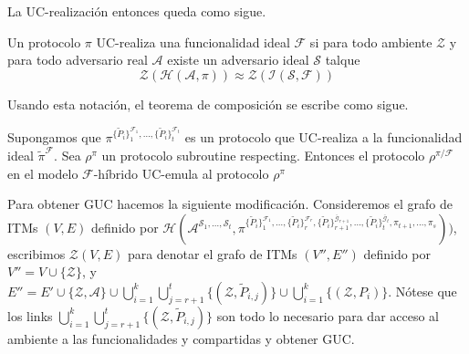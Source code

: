 La UC-realización entonces queda como sigue.

\begin{definicion}
Un protocolo $\pi$ UC-realiza una funcionalidad ideal $\mathcal{F}$ si para todo ambiente
$\mathcal{Z}$ y para todo adversario real $\mathcal{A}$ existe un adversario ideal $\mathcal{S}$
talque
$$\mathcal{Z}(\mathcal{H}(\mathcal{A},\pi))
\approx
\mathcal{Z}(\mathcal{I}(\mathcal{S},\mathcal{F}))$$
\end{definicion}

Usando esta notación, el teorema de composición se escribe como sigue.

\begin{teorema}
Supongamos que
$\pi^{
    \{\tilde{P}_i\}_1^{\mathcal{F}_1},
    \ldots,
    \{\tilde{P}_i\}_t^{\mathcal{F}_t}}$
es un protocolo que UC-realiza a la funcionalidad ideal $\tilde{\pi}^{\mathcal{F}}$. Sea $\rho^\pi$
un protocolo subroutine respecting. Entonces el protocolo
$\rho^{\pi/\mathcal{F}}$ en el modelo $\mathcal{F}$-híbrido UC-emula al protocolo $\rho^\pi$
\end{teorema}

Para obtener GUC hacemos la siguiente modificación. Consideremos el grafo de ITMs $(V, E)$ 
definido por
$\mathcal{H}(
    \mathcal{A}^{\mathcal{S}_1, \ldots, \mathcal{S}_t},
    \pi^{
        \{\tilde{P}_i\}_1^{\mathcal{F}_1},
        \ldots,
        \{\tilde{P}_i\}_r^{\mathcal{F}_r},
        \{\tilde{P}_i\}_{r+1}^{\bar{\mathcal{G}}_{r+1}},
        \ldots,
        \{\tilde{P}_i\}_t^{\bar{\mathcal{G}}_t},
        \pi_{t+1},
        \ldots,
        \pi_s}))$,
escribimos $\mathcal{Z}(V, E)$ para denotar el grafo de ITMs $(V'', E'')$ definido por $V'' = V \cup
\{\mathcal{Z}\}$, y $E'' = E' \cup \{\mathcal{Z}, \mathcal{A}\} \cup \bigcup_{i=1}^k
\bigcup_{j=r+1}^t \{(\mathcal{Z}, \tilde{P}_{i,j})\} \cup \bigcup_{i=1}^k \{(\mathcal{Z}, P_i)\}$.
Nótese que los links $\bigcup_{i=1}^k \bigcup_{j=r+1}^t \{(\mathcal{Z}, \tilde{P}_{i,j})\}$ son todo
lo necesario para dar acceso al ambiente a las funcionalidades y compartidas y obtener GUC.

